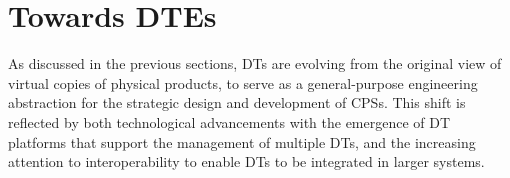 %



\section{Towards \aclp{DTE}}
\label{sec:back:dt:dte}

As discussed in the previous sections, \acp{DT} are evolving from the original view of virtual copies of physical products, to serve as a general-purpose engineering abstraction for the strategic design and development of \acp{CPS}.
%
This shift is reflected by both technological advancements with the emergence of \ac{DT} platforms that support the management of multiple \acp{DT}, and the increasing attention to interoperability to enable \acp{DT} to be integrated in larger systems.


